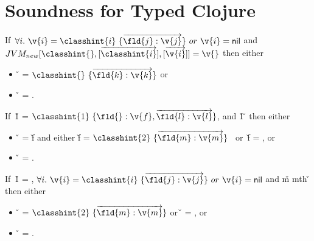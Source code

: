 \section{Soundness for Typed Clojure}

\begin{assumption}[\newjavaliteral] \label{assumption:new}
  If\ $\forall i.\ {\v{i}} = {\classvalue{\classhint{i}}{\overrightarrow{\classfieldpair{\fld{j}} {\v{j}}}}}\ or\ {\v{i}}= {\nil}$
  and $\newjava {\classhint{}}
                {\overrightarrow{\classhint{i}}}
                {\overrightarrow{\v{i}}}
                {\v{}}$
                  then either
                  \begin{itemize}
                    \item
                      \v{} = 
                  ${\classvalue{\classhint{}}{\overrightarrow {\classfieldpair{\fld{k}} {\v{k}}}}}$
                  or
                \item
                  \v{} = 
                  {}.
                  \end{itemize}
\end{assumption}

\begin{assumption}[\getfieldliteral] \label{assumption:field}
  If\ {\v{1}} = ${\classvalue{\classhint{1}}{{\classfieldpair{\fld{}}{\v{f}}, {\overrightarrow{\classfieldpair{\fld{l}} {\v{l}}}}}}}$,
         and  {\v{1}} {\fld{}} {} {\v{}}
                  then either
                  \begin{itemize}
                    \item \v{} = \v{f} and either 
                  \v{f} = ${\classvalue{\classhint{2}}{\overrightarrow{\classfieldpair{\fld{m}} {\v{m}}}}}$
                  \ or\ 
                  \v{f} = \nil,  or
                \item
                  \v{} = {}.
                  \end{itemize}
\end{assumption}

\begin{assumption}[\invokejavamethodliteral] \label{assumption:method}
  If\ {\v{1}} = {},
  $\forall i.\ {\v{i}}={\classvalue{\classhint{i}}{\overrightarrow{\classfieldpair{\fld{j}} {\v{j}}}}}\ or\ {\v{i}}={\nil}$
         and 
   {\v{m}} {mth}
                    {} {}
                    {\classhint{2}}
                    {\v{}}
                  then either
                  \begin{itemize}
                    \item
                  \v{} = ${\classvalue{\classhint{2}}{\overrightarrow{\classfieldpair{\fld{m}} {\v{m}}}}}$
                  or\ 
                  \v{} = \nil,  or
                \item
                  \v{} = {}.
                  \end{itemize}
\end{assumption}

